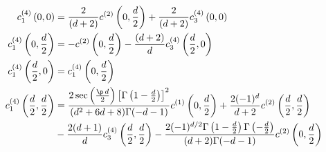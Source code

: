 \documentclass[a4paper,11pt,openright,twoside]{book}
\numberwithin{equation}{section}
\begin{document}
{{\begin{align}
	&\begin{aligned}
		c_1^{(4)}\left(0,0\right)&=\frac{2}{(d+2)}c^{(2)}\left(0,\frac{d}{2}\right)+\frac{2}{(d+2)}c_3^{(4)}\left(0,0\right)\\
		c_1^{(4)}\left(0,\frac{d}{2}\right)&=-c^{(2)}\left(0,\frac{d}{2}\right)-\frac{(d+2)}{d}c_3^{(4)}\left(\frac{d}{2},0\right)\\
		c_1^{(4)}\left(\frac{d}{2},0\right)&=c_1^{(4)}\left(0,\frac{d}{2}\right)\\
		c_1^{(4)}\left(\frac{d}{2},\frac{d}{2}\right)&=\frac{2\sec\left(\frac{\p\,d}{2}\right)\left[\Gamma\left(1-\frac{d}{2}\right)\right]^2}{(d^2+6d+8)\Gamma(-d-1)}c^{(1)}\left(0,\frac{d}{2}\right)+\frac{2(-1)^d}{d+2}c^{(2)}\left(\frac{d}{2},\frac{d}{2}\right)\notag\\
		&-\frac{2(d+1)}{d}c_3^{(4)}\left(\frac{d}{2},\frac{d}{2}\right)-\frac{2(-1)^{d/2}\Gamma\left(1-\frac{d}{2}\right)\Gamma\left(-\frac{d}{2}\right)}{(d+2)\Gamma(-d-1)}c^{(2)}\left(0,\frac{d}{2}\right)\\[2ex]
	\end{aligned}\notag\\
\end{align}
}}
\end{document}
